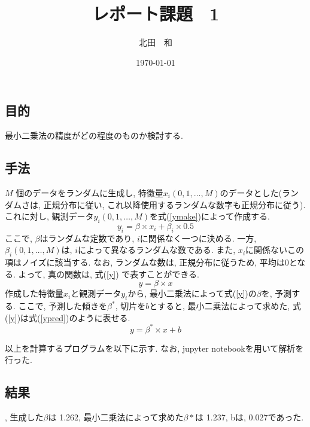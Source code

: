 \documentclass{jsarticle}
\title{レポート課題　1}
\date{\today}
\author{北田　和}
\begin{document}
\maketitle
\newpage


\section{}

\subsection{目的}
最小二乗法の精度がどの程度のものか検討する. 

\subsection{手法}
$M$ 個のデータをランダムに生成し, 特徴量$x_i(0, 1, \dots, M)$のデータとした(ランダムさは, 正規分布に従い, これ以降使用するランダムな数字も正規分布に従う). 
これに対し, 観測データ$y_i(0, 1, \dots, M)$を式(\ref{ymake})によって作成する.
\begin{equation}
\label{ymake}
y_i = \beta \times x_i + \beta_i \times 0.5
\end{equation}
ここで, $\beta$はランダムな定数であり, $i$に関係なく一つに決める. 
一方, $\beta_i(0, 1, \dots, M)$は, $i$によって異なるランダムな数である. 
また, $x_i$に関係ないこの項はノイズに該当する. 
なお, ランダムな数は, 正規分布に従うため, 平均は0となる. 
よって, 真の関数は, 式(\ref{y}) で表すことができる. 
\begin{equation}
\label{y}
y = \beta \times x
\end{equation}
作成した特徴量$x_i$と観測データ$y_i$から, 最小二乗法によって式(\ref{y})の$\beta$を, 予測する. 
ここで, 予測した傾きを$\beta^*$, 切片を$b$とすると, 最小二乗法によって求めた, 式(\ref{y})は式(\ref{ypred})のように表せる. 
\begin{equation}
\label{ypred}
y = \beta^* \times x + b
\end{equation}


以上を計算するプログラムを以下に示す.
なお, jupyter notebookを用いて解析を行った. 





\subsection{結果},
生成した$\beta$は 1.262,
最小二乗法によって求めた$\beta *$は 1.237, bは, 0.027であった. 
\end{document}
